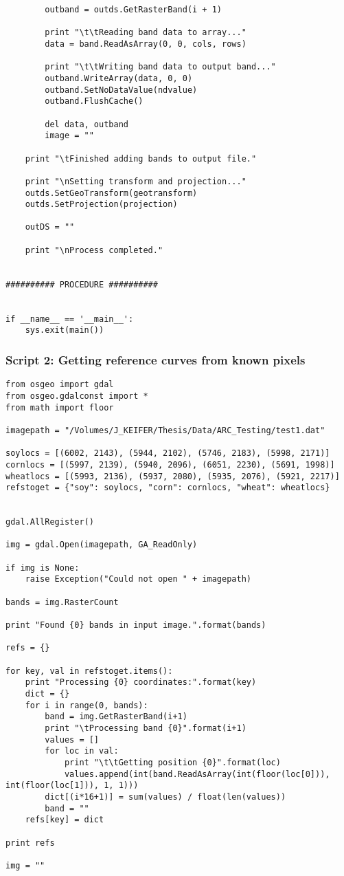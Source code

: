 \begin{verbatim}
        outband = outds.GetRasterBand(i + 1)

        print "\t\tReading band data to array..."
        data = band.ReadAsArray(0, 0, cols, rows)

        print "\t\tWriting band data to output band..."
        outband.WriteArray(data, 0, 0)
        outband.SetNoDataValue(ndvalue)
        outband.FlushCache()

        del data, outband
        image = ""

    print "\tFinished adding bands to output file."

    print "\nSetting transform and projection..."
    outds.SetGeoTransform(geotransform)
    outds.SetProjection(projection)

    outDS = ""

    print "\nProcess completed."


########## PROCEDURE ##########


if __name__ == '__main__':
    sys.exit(main())
\end{verbatim}

\subsubsection*{Script 2: Getting reference curves from known pixels}\label{script2}
\begin{verbatim}
from osgeo import gdal
from osgeo.gdalconst import *
from math import floor

imagepath = "/Volumes/J_KEIFER/Thesis/Data/ARC_Testing/test1.dat"

soylocs = [(6002, 2143), (5944, 2102), (5746, 2183), (5998, 2171)]
cornlocs = [(5997, 2139), (5940, 2096), (6051, 2230), (5691, 1998)]
wheatlocs = [(5993, 2136), (5937, 2080), (5935, 2076), (5921, 2217)]
refstoget = {"soy": soylocs, "corn": cornlocs, "wheat": wheatlocs}


gdal.AllRegister()

img = gdal.Open(imagepath, GA_ReadOnly)

if img is None:
    raise Exception("Could not open " + imagepath)

bands = img.RasterCount

print "Found {0} bands in input image.".format(bands)

refs = {}

for key, val in refstoget.items():
    print "Processing {0} coordinates:".format(key)
    dict = {}
    for i in range(0, bands):
        band = img.GetRasterBand(i+1)
        print "\tProcessing band {0}".format(i+1)
        values = []
        for loc in val:
            print "\t\tGetting position {0}".format(loc)
            values.append(int(band.ReadAsArray(int(floor(loc[0])), int(floor(loc[1])), 1, 1)))
        dict[(i*16+1)] = sum(values) / float(len(values))
        band = ""
    refs[key] = dict

print refs

img = ""
\end{verbatim}

